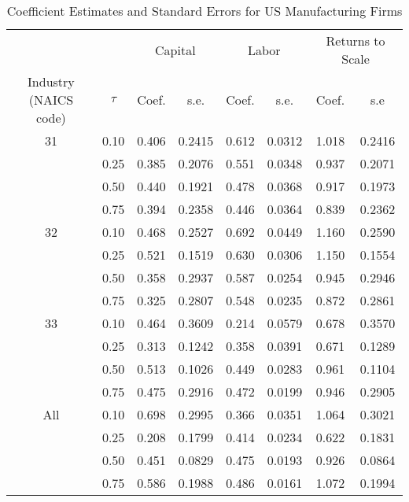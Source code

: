 \begin{table}[ht]
\centering
\caption{Coefficient Estimates and Standard Errors for US Manufacturing Firms} 
\begin{tabular}{cccccccc}
  \hline\hline & & \multicolumn{2}{c}{Capital}  & \multicolumn{2}{c}{Labor} & \multicolumn{2}{c}{Returns to Scale} \\ \cmidrule(lr){3-4} \cmidrule(lr){5-6} \cmidrule(lr){7-8}Industry (NAICS code) & $\tau$ & Coef. & s.e. & Coef. & s.e. & Coef. & s.e \\ 
  \hline
31 & 0.10 & 0.406 & 0.2415 & 0.612 & 0.0312 & 1.018 & 0.2416 \\ 
   & 0.25 & 0.385 & 0.2076 & 0.551 & 0.0348 & 0.937 & 0.2071 \\ 
   & 0.50 & 0.440 & 0.1921 & 0.478 & 0.0368 & 0.917 & 0.1973 \\ 
   & 0.75 & 0.394 & 0.2358 & 0.446 & 0.0364 & 0.839 & 0.2362 \\ 
  32 & 0.10 & 0.468 & 0.2527 & 0.692 & 0.0449 & 1.160 & 0.2590 \\ 
   & 0.25 & 0.521 & 0.1519 & 0.630 & 0.0306 & 1.150 & 0.1554 \\ 
   & 0.50 & 0.358 & 0.2937 & 0.587 & 0.0254 & 0.945 & 0.2946 \\ 
   & 0.75 & 0.325 & 0.2807 & 0.548 & 0.0235 & 0.872 & 0.2861 \\ 
  33 & 0.10 & 0.464 & 0.3609 & 0.214 & 0.0579 & 0.678 & 0.3570 \\ 
   & 0.25 & 0.313 & 0.1242 & 0.358 & 0.0391 & 0.671 & 0.1289 \\ 
   & 0.50 & 0.513 & 0.1026 & 0.449 & 0.0283 & 0.961 & 0.1104 \\ 
   & 0.75 & 0.475 & 0.2916 & 0.472 & 0.0199 & 0.946 & 0.2905 \\ 
  All & 0.10 & 0.698 & 0.2995 & 0.366 & 0.0351 & 1.064 & 0.3021 \\ 
   & 0.25 & 0.208 & 0.1799 & 0.414 & 0.0234 & 0.622 & 0.1831 \\ 
   & 0.50 & 0.451 & 0.0829 & 0.475 & 0.0193 & 0.926 & 0.0864 \\ 
   & 0.75 & 0.586 & 0.1988 & 0.486 & 0.0161 & 1.072 & 0.1994 \\ 
   \hline
\end{tabular}
\end{table}
